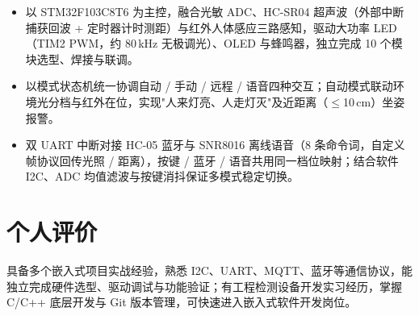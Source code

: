\documentclass[10pt,a4paper]{article}
\begin{document}
\begin{itemize}[leftmargin=1.5em, itemsep=2pt, parsep=0pt, topsep=2pt]
    \item 以 STM32F103C8T6 为主控，融合光敏 ADC、HC-SR04 超声波（外部中断捕获回波 + 定时器计时测距）与红外人体感应三路感知，驱动大功率 LED（TIM2 PWM，约 80\,kHz 无极调光）、OLED 与蜂鸣器，独立完成 10 个模块选型、焊接与联调。
    \item 以模式状态机统一协调自动 / 手动 / 远程 / 语音四种交互；自动模式联动环境光分档与红外在位，实现"人来灯亮、人走灯灭"及近距离（$\leq$10\,cm）坐姿报警。
    \item 双 UART 中断对接 HC-05 蓝牙与 SNR8016 离线语音（8 条命令词，自定义帧协议回传光照 / 距离），按键 / 蓝牙 / 语音共用同一档位映射；结合软件 I2C、ADC 均值滤波与按键消抖保证多模式稳定切换。
\end{itemize}

\vspace{0.1em}

\section{\faUser\hspace{0.4em}个人评价}

具备多个嵌入式项目实战经验，熟悉 I2C、UART、MQTT、蓝牙等通信协议，能独立完成硬件选型、驱动调试与功能验证；有工程检测设备开发实习经历，掌握 C/C++ 底层开发与 Git 版本管理，可快速进入嵌入式软件开发岗位。
\end{document}
